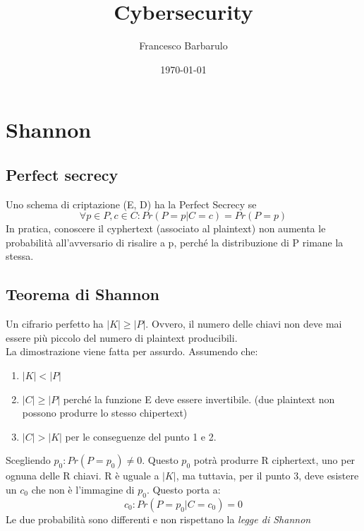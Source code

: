 \documentclass[a4paper,12pt]{article}
\title{Cybersecurity}
\author{Francesco Barbarulo}
\date{\monthyeardate\today}
\begin{document}

\maketitle
{}

\tableofcontents

\newpage


\section{Shannon}
\subsection{Perfect secrecy}
Uno schema di criptazione (E, D) ha la Perfect Secrecy se
$$ \forall p \in P, c \in C : Pr(P = p | C = c) = Pr(P = p) $$
In pratica, conoscere il cyphertext (associato al plaintext) non aumenta le probabilità all'avversario di risalire a p, perché la distribuzione di P rimane la stessa.
\subsection{Teorema di Shannon}
Un cifrario perfetto ha $ |K| \geq |P| $.
Ovvero, il numero delle chiavi non deve mai essere più piccolo del numero di plaintext producibili. \\
La dimostrazione viene fatta per assurdo. Assumendo che:
\begin{enumerate}
	\item $|K| < |P|$
	\item $|C| \geq |P|$ perché la funzione E deve essere invertibile. (due plaintext non possono produrre lo stesso chipertext)
	\item $|C| > |K|$ per le conseguenze del punto 1 e 2.
\end{enumerate}
Scegliendo $p_0 : Pr(P = p_0) \neq 0$. Questo $p_0$ potrà produrre R ciphertext, uno per ognuna delle R chiavi.
R è uguale a $|K|$, ma tuttavia, per il punto 3, deve esistere un $c_0$ che non è l'immagine di $p_0$. 
Questo porta a:
$$ c_0 : Pr(P = p_0 | C = c_0) = 0 $$ 
Le due probabilità sono differenti e non rispettano la \textit{legge di Shannon}
\end{document}
